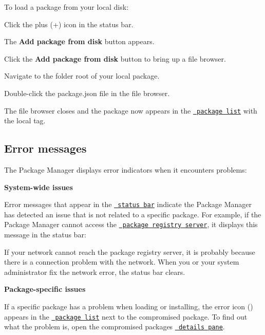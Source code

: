 To load a package from your local disk\+:


\begin{DoxyEnumerate}
\item Click the plus ({\ttfamily +}) icon in the status bar.

The {\bfseries{Add package from disk}} button appears.


\item Click the {\bfseries{Add package from disk}} button to bring up a file browser.
\item Navigate to the folder root of your local package.
\item Double-\/click the {\ttfamily package.\+json} file in the file browser.

The file browser closes and the package now appears in the \href{\#PackManLists}{\texttt{ package list}} with the {\ttfamily local} tag.
\end{DoxyEnumerate}

\label{_troubleshooting}%
 \subsection*{Error messages}

The Package Manager displays error indicators when it encounters problems\+:


\begin{DoxyItemize}
\item {\bfseries{System-\/wide issues}}

Error messages that appear in the \href{\#statusbar}{\texttt{ status bar}} indicate the Package Manager has detected an issue that is not related to a specific package. For example, if the Package Manager cannot access the \href{\#PackManRegistry}{\texttt{ package registry server}}, it displays this message in the status bar\+:



If your network cannot reach the package registry server, it is probably because there is a connection problem with the network. When you or your system administrator fix the network error, the status bar clears.
\item {\bfseries{Package-\/specific issues}}

If a specific package has a problem when loading or installing, the error icon () appears in the \href{\#PackManLists}{\texttt{ package list}} next to the compromised package. To find out what the problem is, open the compromised package\textquotesingle{}s \href{\#PackManDetails}{\texttt{ details pane}}.
\end{DoxyItemize}

